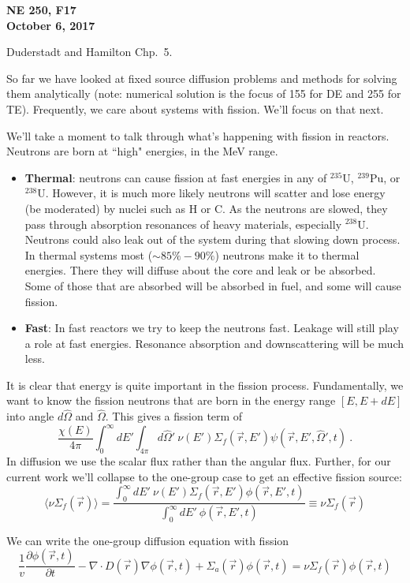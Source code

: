 \documentclass[12pt]{article}
\newcommand{\vOmega}{\ensuremath{\hat{\Omega}}}
\begin{document}
\begin{center}
{\bf NE 250, F17\\
October 6, 2017 
}
\end{center}

Duderstadt and Hamilton Chp.\ 5.

So far we have looked at fixed source diffusion problems and methods for solving them analytically (note: numerical solution is the focus of 155 for DE and 255 for TE). Frequently, we care about systems with fission. We'll focus on that next.

We'll take a moment to talk through what's happening with fission in reactors. Neutrons are born at ``high" energies, in the MeV range. 
\begin{itemize}
\item \textbf{Thermal}: neutrons can cause fission at fast energies in any of $^{235}$U, $^{239}$Pu, or $^{238}$U. However, it is much more likely neutrons will scatter and lose energy (be moderated) by nuclei such as H or C. As the neutrons are slowed, they pass through absorption resonances of heavy  materials, especially $^{238}$U. Neutrons could also leak out of the system during that slowing down process. In thermal systems most ($\sim 85\%-90\%$) neutrons make it to thermal energies. There they will diffuse about the core and leak or be absorbed. Some of those that are absorbed will be absorbed in fuel, and some will cause fission.

\item \textbf{Fast}: In fast reactors we try to keep the neutrons fast. Leakage will still play a role at fast energies. Resonance absorption and downscattering will be much less. 
\end{itemize}
%
It is clear that energy is quite important in the fission process. Fundamentally, we want to know the fission neutrons that are born in the energy range $[E, E+dE]$ into angle $d\vOmega$ and $\vOmega$. This gives a fission term of 
\[
\frac{\chi(E)}{4\pi} \int_0^{\infty} dE' \int_{4\pi} d\vOmega' \: \nu(E') \Sigma_f(\vec{r}, E') \psi(\vec{r}, E', \vOmega', t) \:.  
\] 
In diffusion we use the scalar flux rather than the angular flux. Further, for our current work we'll collapse to the one-group case to get an effective fission source:
\[
\langle \nu \Sigma_f (\vec{r}) \rangle = \frac{\int_0^{\infty} dE'\: \nu(E') \Sigma_f(\vec{r}, E') \phi(\vec{r}, E', t)} {\int_0^{\infty} dE'\: \phi(\vec{r}, E', t)} \equiv \nu \Sigma_f (\vec{r}) 
\]

We can write the one-group diffusion equation with fission
\begin{equation}
\frac{1}{v} \frac{\partial \phi(\vec{r}, t)}{\partial t} - \nabla \cdot D(\vec{r}) \nabla	\phi(\vec{r}, t) + \Sigma_a(\vec{r}) \phi(\vec{r}, t) = \nu\Sigma_f (\vec{r})\phi(\vec{r}, t)
\end{equation}
\end{document}
